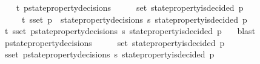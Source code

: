 \begin{isabellebody}
\ \ \isamarkupfalse%
\ {\isachardoublequoteopen}{\isasymexists}{\isasymsigma}{\isasymin}{\isasymSigma}t{\isachardot}\ {\isasymforall}p{\isasymin}{\isasymUnion}{\isacharbraceleft}state{\isacharunderscore}property{\isacharunderscore}decisions\ {\isasymsigma}\ {\isacharbar}\ {\isasymsigma}{\isachardot}\ {\isasymsigma}\ {\isasymin}\ {\isasymsigma}{\isacharunderscore}set{\isacharbraceright}{\isachardot}\ state{\isacharunderscore}property{\isacharunderscore}is{\isacharunderscore}decided\ {\isacharparenleft}p{\isacharcomma}{\isasymsigma}{\isacharparenright}{\isachardoublequoteclose}\isanewline
\ \ \isamarkupfalse%
{\isacharminus}\isanewline
\ \ \ \ \isamarkupfalse%
\ {\isasymsigma}\ \ {\isachardoublequoteopen}{\isasymsigma}\ {\isasymin}\ {\isasymSigma}t{\isachardoublequoteclose}\ {\isachardoublequoteopen}{\isasymforall}s{\isasymin}{\isasymsigma}{\isacharunderscore}set{\isachardot}\ {\isacharparenleft}{\isasymforall}p\ {\isasymin}\ state{\isacharunderscore}property{\isacharunderscore}decisions\ s{\isachardot}\ state{\isacharunderscore}property{\isacharunderscore}is{\isacharunderscore}decided\ {\isacharparenleft}p{\isacharcomma}{\isasymsigma}{\isacharparenright}{\isacharparenright}{\isachardoublequoteclose}\isanewline
\ \ \ \ \ \ \isamarkupfalse%
\ {\isacartoucheopen}{\isasymexists}{\isasymsigma}{\isasymin}{\isasymSigma}t{\isachardot}\ {\isasymforall}s{\isasymin}{\isasymsigma}{\isacharunderscore}set{\isachardot}\ {\isasymforall}p{\isasymin}state{\isacharunderscore}property{\isacharunderscore}decisions\ s{\isachardot}\ state{\isacharunderscore}property{\isacharunderscore}is{\isacharunderscore}decided\ {\isacharparenleft}p{\isacharcomma}\ {\isasymsigma}{\isacharparenright}{\isacartoucheclose}\ \isamarkupfalse%
\ blast\isanewline
\ \ \ \ \isamarkupfalse%
\ {\isachardoublequoteopen}{\isasymforall}p{\isasymin}{\isasymUnion}{\isacharbraceleft}state{\isacharunderscore}property{\isacharunderscore}decisions\ {\isasymsigma}\ {\isacharbar}\ {\isasymsigma}{\isachardot}\ {\isasymsigma}\ {\isasymin}\ {\isasymsigma}{\isacharunderscore}set{\isacharbraceright}{\isachardot}\ state{\isacharunderscore}property{\isacharunderscore}is{\isacharunderscore}decided\ {\isacharparenleft}p{\isacharcomma}{\isasymsigma}{\isacharparenright}{\isachardoublequoteclose}\isanewline
\ \ \ \ \ \ \isamarkupfalse%
\ {\isacartoucheopen}{\isasymforall}s{\isasymin}{\isasymsigma}{\isacharunderscore}set{\isachardot}\ {\isasymforall}p{\isasymin}state{\isacharunderscore}property{\isacharunderscore}decisions\ s{\isachardot}\ state{\isacharunderscore}property{\isacharunderscore}is{\isacharunderscore}decided\ {\isacharparenleft}p{\isacharcomma}\ {\isasymsigma}{\isacharparenright}{\isacartoucheclose}\ \isamarkupfalse%

\end{isabellebody}
